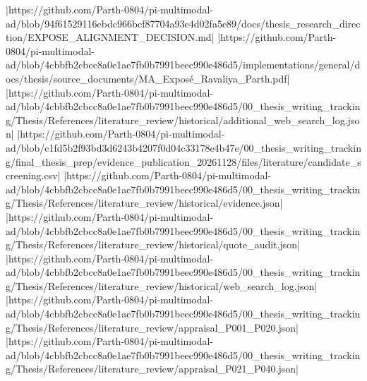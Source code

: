 |https://github.com/Parth-0804/pi-multimodal-ad/blob/94f61529116ebdc966bcf87704a93e4d02fa5e89/docs/thesis_research_direction/EXPOSE_ALIGNMENT_DECISION.md|
|https://github.com/Parth-0804/pi-multimodal-ad/blob/4cbbfb2cbcc8a0e1ae7fb0b7991beec990e486d5/implementations/general/docs/thesis/source_documents/MA_Exposé_Ravaliya_Parth.pdf|
|https://github.com/Parth-0804/pi-multimodal-ad/blob/4cbbfb2cbcc8a0e1ae7fb0b7991beec990e486d5/00_thesis_writing_tracking/Thesis/References/literature_review/historical/additional_web_search_log.json|
|https://github.com/Parth-0804/pi-multimodal-ad/blob/c1fd5b2f93bd3d6243b4207f0d04c33178e4b47e/00_thesis_writing_tracking/final_thesis_prep/evidence_publication_20261128/files/literature/candidate_screening.csv|
|https://github.com/Parth-0804/pi-multimodal-ad/blob/4cbbfb2cbcc8a0e1ae7fb0b7991beec990e486d5/00_thesis_writing_tracking/Thesis/References/literature_review/historical/evidence.json|
|https://github.com/Parth-0804/pi-multimodal-ad/blob/4cbbfb2cbcc8a0e1ae7fb0b7991beec990e486d5/00_thesis_writing_tracking/Thesis/References/literature_review/historical/quote_audit.json|
|https://github.com/Parth-0804/pi-multimodal-ad/blob/4cbbfb2cbcc8a0e1ae7fb0b7991beec990e486d5/00_thesis_writing_tracking/Thesis/References/literature_review/historical/web_search_log.json|
|https://github.com/Parth-0804/pi-multimodal-ad/blob/4cbbfb2cbcc8a0e1ae7fb0b7991beec990e486d5/00_thesis_writing_tracking/Thesis/References/literature_review/appraisal_P001_P020.json|
|https://github.com/Parth-0804/pi-multimodal-ad/blob/4cbbfb2cbcc8a0e1ae7fb0b7991beec990e486d5/00_thesis_writing_tracking/Thesis/References/literature_review/appraisal_P021_P040.json|
